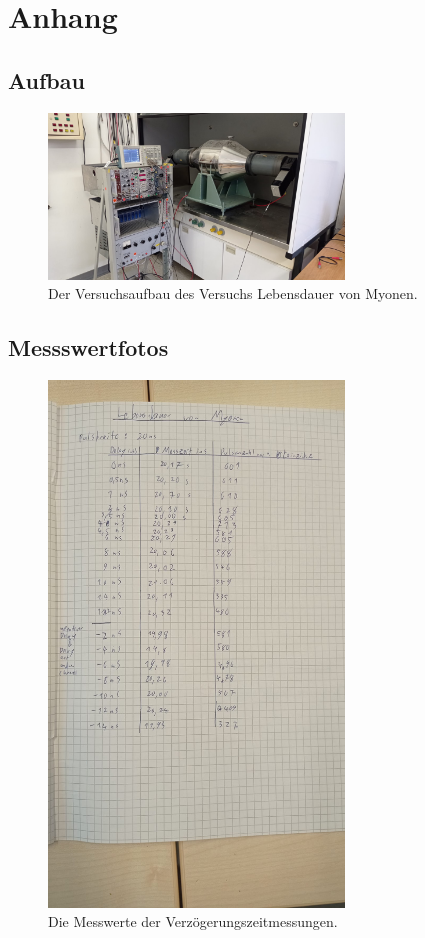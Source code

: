 \newpage
\section{Anhang}

\subsection{Aufbau}

\begin{figure}[h]
    \centering
    \includegraphics[width=0.7\textwidth]{latex/images/aufbau_real.jpeg}
    \caption{Der Versuchsaufbau des Versuchs Lebensdauer von Myonen.}
\end{figure}

\subsection{Messswertfotos}

\begin{figure}[h]
    \centering
    \includegraphics[width=0.7\textwidth]{latex/images/Messwerte_1.jpeg}
    \caption{Die Messwerte der Verzögerungszeitmessungen.}
    \label{img:mess1}
\end{figure}

